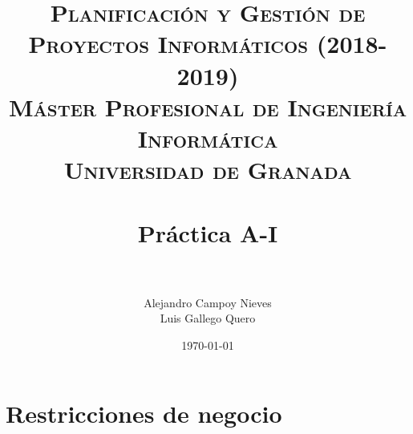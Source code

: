 

\title{	
	\normalfont \normalsize 
	\textsc{\textbf{Planificación y Gestión de Proyectos Informáticos (2018-2019)} \\ Máster Profesional de Ingeniería Informática \\ Universidad de Granada} \\ [25pt] %
	\horrule{0.5pt} \\[0.4cm] %
	\huge Práctica A-I \\ %
	\horrule{2pt} \\[0.5cm] %
}

\author{Alejandro Campoy Nieves \\ Luis Gallego Quero} %
\date{\normalsize\today} %

\usepackage[spanish, es-tabla]{babel}
\usepackage{hyperref} %
\hypersetup{
	colorlinks=true,
	linkcolor=blue,
	filecolor=magenta,      
	urlcolor=cyan,
}
\usepackage{graphicx}
\usepackage{amssymb, amsmath, amsbsy}
\usepackage{mathptmx}	
\usepackage{float}
\usepackage{booktabs}					%
\usepackage{eurosym}
\usepackage{xcolor}
\usepackage{colortbl}




	\maketitle %
	
	\newpage %
	
	\tableofcontents %
	
	\listoffigures
	
	\listoftables	
	
	\newpage	
 
\section{Restricciones de negocio}


